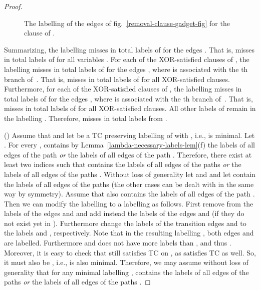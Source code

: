 \documentclass[a4paper,UKenglish]{article}
\begin{document}
\begin{proof}
\begin{figure}[tbh]
\caption{The labelling  of the edges of fig.~\protect\ref{removal-clause-gadget-fig} for
the clause  of .}
\label{removal-assignment-fig}
\end{figure}

Summarizing, the labelling  misses in total  labels of  for the edges .
That is,  misses in total  labels of  for
all variables . For each of the  XOR-satisfied
clauses  of , the labelling  misses in
total  labels of  for the edges , where  is associated with the th
branch of~. That is,  misses in total  labels of  for all XOR-satisfied clauses. Furthermore, for each of
the  XOR-satisfied clauses  of , the
labelling  misses in total  labels of  for the
edges , where  is associated with the th
branch of~. That is,  misses in total 
labels of  for all XOR-satisfied clauses. All other labels
of  remain in the labelling . Therefore,  misses in total  labels
from .




() Assume that  and let  be a TC preserving labelling of  with , i.e.,  is minimal. Let . For every ,  contains by Lemma~\ref {lambda-necessary-labels-lem}(f) the labels of all edges of the path  \emph{or} the labels of all edges of the path . Therefore, there
exist at least two indices  such that 
contains the labels of all edges of the paths  
\emph{or} the labels of all edges of the paths .
Without loss of generality let  and  and let 
contain the labels of all edges of the paths  (the other
cases can be dealt with in the same way by symmetry). Assume that  also
contains the labels of all edges of the path . Then we can
modify the labelling  to a labelling  as
follows. First remove from  the labels of the edges  and  and add instead the
labels of the edges  and  (if they do not exist yet in ).
Furthermore change the labels of the transition edges  and  to the labels  and , respectively. Note that in the resulting labelling , both edges  and  are labelled. Furthermore  and  does not have more
labels than , and thus .
Moreover, it is easy to check that  still satisfies TC on , as  satisfies TC as
well. So, it must also be , i.e.,  is also minimal. Therefore, we may assume without loss of generality that for any
minimal labelling ,  contains
the labels of all edges of the paths  \emph{or} the
labels of all edges of the paths . 


\end{proof}
\end{document}
